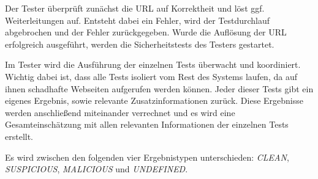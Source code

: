 Der Tester überprüft zunächst die \acs{URL} auf Korrektheit und löst ggf. Weiterleitungen
auf.
Entsteht dabei ein Fehler, wird der Testdurchlauf abgebrochen und der Fehler zurückgegeben.
Wurde die Auflösung der \acs{URL} erfolgreich ausgeführt, werden die Sicherheitstests des Testers
gestartet.

Im Tester wird die Ausführung der einzelnen Tests überwacht und koordiniert.
Wichtig dabei ist, dass alle Tests isoliert vom Rest des Systems laufen, da auf ihnen
schadhafte Webseiten aufgerufen werden können.
Jeder dieser Tests gibt ein eigenes Ergebnis, sowie relevante Zusatzinformationen zurück.
Diese Ergebnisse werden anschließend miteinander verrechnet und es wird eine Gesamteinschätzung mit
allen relevanten Informationen der einzelnen Tests erstellt.

Es wird zwischen den folgenden vier Ergebnistypen unterschieden: \textit{CLEAN},
\textit{SUSPICIOUS}, \textit{MALICIOUS} und \textit{UNDEFINED}.

\newpage

